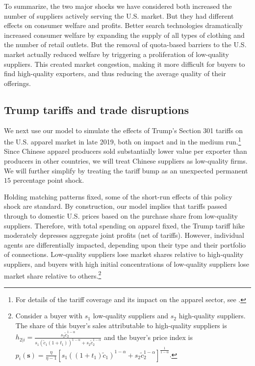 \documentclass[12pt]{article} \usepackage{amsmath,amssymb,amsthm,geometry,graphicx,setspace,algorithm,algpseudocode,float}
\begin{document}
To summarize, the two major shocks we have considered both increased the number of suppliers actively serving the U.S. market. But they had different effects on consumer welfare and profits. Better search technologies dramatically increased consumer welfare by expanding the supply of all types of clothing and the number of retail outlets. But the removal of quota-based barriers to the U.S. market actually reduced welfare by triggering a proliferation of low-quality suppliers. This created market congestion, making it more difficult for buyers to find high-quality exporters, and thus reducing the average quality of their offerings.

\subsection{Trump tariffs and trade disruptions}
\label{sec:tariff}
We next use our model to simulate the effects of Trump's Section 301 tariffs on the U.S. apparel market in late 2019, both on impact and in the medium run.\footnote{For details of the tariff coverage and its impact on the apparel sector, see \cite{USITC2023}\medskip.} Since Chinese apparel producers sold substantially lower value per exporter than producers in other countries, we will treat Chinese suppliers as low-quality firms. We will further simplify by treating the tariff bump as an unexpected permanent $15$ percentage point shock.
\par
Holding matching patterns fixed, some of the short-run effects of this policy shock are standard. By construction, our model implies that tariffs passed through to domestic U.S. prices based on the purchase share from low-quality suppliers. Therefore, with total spending on apparel fixed, the Trump tariff hike moderately depresses aggregate joint profits (net of tariffs).  However, individual agents are differentially impacted, depending upon their type and their portfolio of connections. Low-quality suppliers lose market shares relative to high-quality suppliers, and buyers with high initial concentrations of low-quality suppliers lose market share relative to others.\footnote{Consider a buyer with $s_1$ low-quality suppliers and $s_2$ high-quality suppliers. The share of this buyer's sales attributable to high-quality suppliers is $h_{2|i} = \frac{s_2\tilde{c}_2^{1-\alpha}}{s_1(\tilde{c}_1(1+t_1))^{1-\alpha}+s_2\tilde{c}_2^{1-\alpha}}$ and the buyer's price index is $p_i(\mathbf{s}) = \frac{\eta}{\eta-1}[s_1((1+t_1)\tilde{c}_1)^{1-\alpha}+s_2\tilde{c}_2^{1-\alpha}]^{\frac{1}{1-\alpha}}$.\medskip} 
\end{document}
